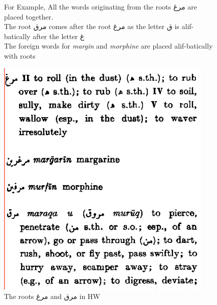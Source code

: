 \begin{figure}
\begin{minipage}{.5\textwidth}

		For Example, All the words originating from the roots \textarabic{مرغ} are placed together. \\
		
		The root \textarabic{مرق} comes after the root \textarabic{مرغ} as the letter \textarabic{ق} is alif-batically after the letter \textarabic{غ} \\
		
		The foreign words for \textit{margin} and \textit{morphine} are placed alif-batically with roots

\end{minipage}
\begin{minipage}{.5\textwidth}
	\quad  \includegraphics[width=.9\linewidth]{chapters/images/hans_mrg}
		\caption{The roots \textarabic{مرغ} and \textarabic{مرق} in HW}
\end{minipage}
\end{figure}

